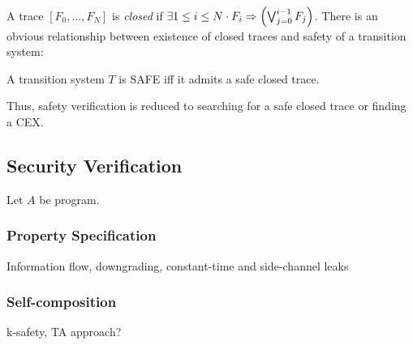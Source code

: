 A trace $[F_0, \ldots, F_N]$ is \emph{closed} if $\exists 1 \leq i
\leq N \cdot F_i \Rightarrow \left( \bigvee_{j=0}^{i-1}F_j\right)$. There is an
obvious relationship between existence of closed traces and safety of
a transition system:
\begin{theorem}
  \label{thm:closed-safety}
  A transition system $T$ is SAFE iff it admits a safe closed trace.
\end{theorem}
Thus, safety verification is reduced to searching for a safe closed
trace or finding a CEX.


\subsection{Security Verification}

Let $A$ be program.

\subsubsection{Property Specification}
Information flow, downgrading, constant-time and side-channel leaks

\subsubsection{Self-composition}
k-safety, TA approach?

